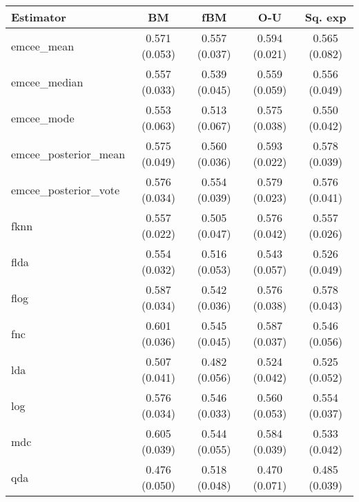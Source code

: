 \begin{table}[p]
  \centering
  \begin{tabular}{lcccc}
\toprule
            \textbf{Estimator} &            \textbf{BM} &           \textbf{fBM} &           \textbf{O-U} &        \textbf{Sq. exp} \\
\midrule

          emcee\_mean & 0.571 (0.053) & 0.557 (0.037) & 0.594 (0.021) & 0.565 (0.082) \\
        emcee\_median & 0.557 (0.033) & 0.539 (0.045) & 0.559 (0.059) & 0.556 (0.049) \\
          emcee\_mode & 0.553 (0.063) & 0.513 (0.067) & 0.575 (0.038) & 0.550 (0.042) \\
emcee\_posterior\_mean & 0.575 (0.049) & 0.560 (0.036) & 0.593 (0.022) & 0.578 (0.039) \\
emcee\_posterior\_vote & 0.576 (0.034) & 0.554 (0.039) & 0.579 (0.023) & 0.576 (0.041) \\
                fknn & 0.557 (0.022) & 0.505 (0.047) & 0.576 (0.042) & 0.557 (0.026) \\
                flda & 0.554 (0.032) & 0.516 (0.053) & 0.543 (0.057) & 0.526 (0.049) \\
                flog & 0.587 (0.034) & 0.542 (0.036) & 0.576 (0.038) & 0.578 (0.043) \\
                 fnc & 0.601 (0.036) & 0.545 (0.045) & 0.587 (0.037) & 0.546 (0.056) \\
                 lda & 0.507 (0.041) & 0.482 (0.056) & 0.524 (0.042) & 0.525 (0.052) \\
                 log & 0.576 (0.034) & 0.546 (0.033) & 0.560 (0.053) & 0.554 (0.037) \\
                 mdc & 0.605 (0.039) & 0.544 (0.055) & 0.584 (0.039) & 0.533 (0.042) \\
                 qda & 0.476 (0.050) & 0.518 (0.048) & 0.470 (0.071) & 0.485 (0.039) \\


\end{tabular}
\end{table}
